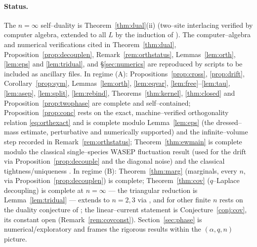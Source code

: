 \documentclass[11pt]{article}
\theoremstyle{plain}
\theoremstyle{definition}
\theoremstyle{remark}
\begin{document}
\paragraph{Status.} The $n=\infty$ self--duality is Theorem~\ref{thm:dual}(ii)
(two--site interlacing verified by computer algebra, extended to all $L$ by the
induction of \cite{REU}). The computer--algebra and numerical verifications cited in
Theorem~\ref{thm:dual}, Proposition~\ref{prop:decouplen}, Remark~\ref{rem:orthstatus},
Lemmas~\ref{lem:orth}, \ref{lem:eps} and \ref{lem:tridual}, and \S\ref{sec:numerics}
are reproduced by scripts to be included as ancillary files. In regime (A): Propositions~\ref{prop:cross},
\ref{prop:drift}, Corollary~\ref{prop:sym}, Lemmas~\ref{lem:orth}, \ref{lem:eqvar},
\ref{lem:free}--\ref{lem:tau}, \ref{lem:asep}, \ref{lem:split}, \ref{lem:rebind},
Theorems~\ref{thm:kernel}, \ref{thm:closed} and Proposition~\ref{prop:twophase} are
complete and self--contained; Proposition~\ref{prop:conc} rests on the exact,
machine--verified orthogonality relation \eqref{eq:orthexact} and is complete modulo
Lemma~\ref{lem:eps} (the dressed--mass estimate, perturbative and numerically
supported) and the infinite--volume step recorded in Remark~\ref{rem:orthstatus}; Theorem~\ref{thm:ewmain} is complete modulo the classical
single--species WASEP fluctuation result (used for the drift via
Proposition~\ref{prop:decouple} and the diagonal noise) and the classical
tightness/uniqueness \cite{KL}. In regime
(B): Theorem~\ref{thm:marg} (marginals, every $n$, via
Proposition~\ref{prop:decouplen}) is complete; Theorem~\ref{thm:cov} ($q$--Laplace
decoupling) is complete at $n=\infty$ --- the triangular reduction is
Lemma~\ref{lem:tridual} --- extends to $n=2,3$ via \cite{REU}, and for other finite
$n$ rests on the duality conjecture of \cite[Rmk.~4]{REU}; the linear--current
statement is Conjecture~\ref{conj:cov}, its constant open
(Remark~\ref{rem:covconst}). Section~\ref{sec:phase} is numerical/exploratory and frames the rigorous
results within the $(\alpha,q,n)$ picture.
\end{document}
